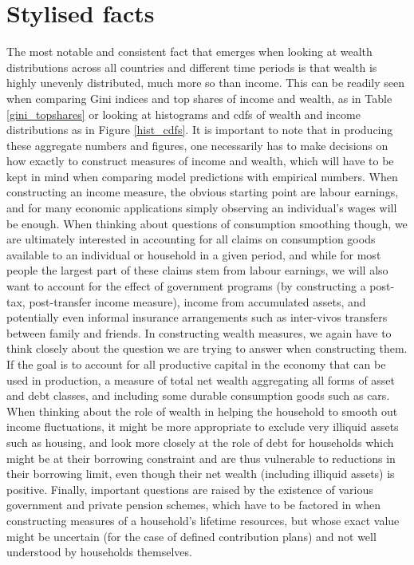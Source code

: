 \section{Stylised facts}
The most notable and consistent fact that emerges when looking at wealth
distributions across all countries and different time periods is that wealth
is highly unevenly distributed, much more so than income. This can be readily
seen when comparing Gini indices and top shares of income and wealth, as in
Table \ref{gini_topshares} or looking at histograms and cdfs of wealth and
income distributions as in Figure \ref{hist_cdfs}. It is important to note
that in producing these aggregate numbers and figures, one necessarily has
to make decisions on how exactly to construct measures of income and wealth,
which will have to be kept in mind when comparing model predictions with
empirical numbers. When constructing an income measure, the obvious starting
point are labour earnings, and for many economic applications simply
observing an individual's wages will be enough. When thinking about questions
of consumption smoothing though, we are ultimately interested in accounting
for all claims on consumption goods available to an individual or household
in a given period, and while for most people the largest part of these claims
stem from labour earnings, we will also want to account for the effect of
government programs (by constructing a post-tax, post-transfer income measure),
income from accumulated assets, and potentially even informal insurance
arrangements such as inter-vivos transfers between family and friends.
In constructing wealth measures, we again have to think closely about the
question we are trying to answer when constructing them. If the goal is to
account for all productive capital in the economy that can be used in
production, a measure of total net wealth aggregating all forms of asset and
debt classes, and including some durable consumption goods such as cars. When
thinking about the role of wealth in helping the household to smooth out
income fluctuations, it might be more appropriate to exclude very illiquid
assets such as housing, and look more closely at the role of debt for households
which might be at their borrowing constraint and are thus vulnerable to
reductions in their borrowing limit, even though their net wealth (including
illiquid assets) is positive. Finally, important questions are raised by
the existence of various government and private pension schemes, which have
to be factored in when constructing measures of a household's lifetime
resources, but whose exact value might be uncertain (for the case of defined
contribution plans) and not well understood by households themselves.


